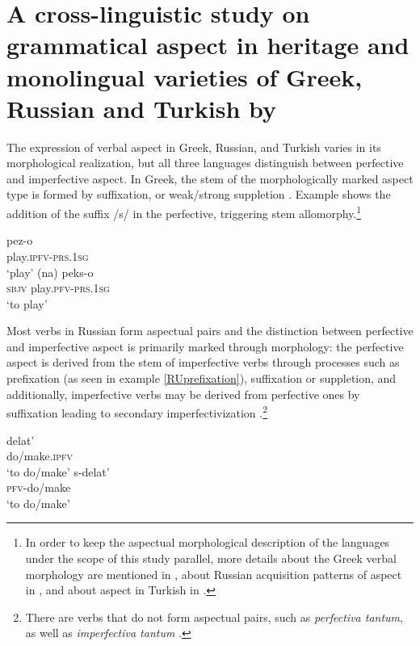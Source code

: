 \documentclass[output=paper,colorlinks,citecolor=brown]{langscibook}
\begin{document}
\section{A cross-linguistic study on grammatical aspect in heritage and monolingual varieties of Greek, Russian and Turkish by \textcite{RizouEtAl}} \label{cross-linguistic_study}

The expression of verbal aspect in Greek, Russian, and Turkish varies in its morphological realization, but all three languages distinguish between perfective and imperfective aspect. In Greek, the stem of the morphologically marked aspect type is formed by suffixation, or weak/strong suppletion \parencite{spyropoulos2017root, revithiadou2019changing}. Example  shows the addition of the suffix /s/ in the perfective, triggering stem allomorphy.\footnote{In order to keep the aspectual morphological description of the languages under the scope of this study parallel, more details about the Greek verbal morphology are mentioned in , about Russian acquisition patterns of aspect in , and about aspect in Turkish in .}

\eal \label{play_rizou}
\ex \gll pez-o\\
 play.\textsc{ipfv-prs.1sg}\\
\glt `play' 
\ex 
\gll (na) peks-o \\
     \textsc{sbjv} play.\textsc{pfv-prs.1sg}\\
\glt `to play' 
\zl 

Most verbs in Russian form aspectual pairs and the distinction between perfective and imperfective aspect is primarily marked through morphology: the perfective aspect is derived from the stem of imperfective verbs through processes such as prefixation (as seen in example \ref{RUprefixation}), suffixation or suppletion, and additionally, imperfective verbs may be derived from perfective ones by suffixation leading to secondary imperfectivization \parencite{gagarina2008anaphoric}.\footnote{There are verbs that do not form aspectual pairs, such as \textit{perfectiva tantum}, as well as \textit{imperfectiva tantum} \parencite{Gagarina2007}.} 

\eal \label{RUprefixation}
 \ex \gll delat'\\
 do/make.\textsc{ipfv}\\
 \glt `to do/make' 
 \ex \gll s-delat' \\
 \textsc{pfv}-do/make\\
 \glt `to do/make' 
 \zl 
\end{document}
